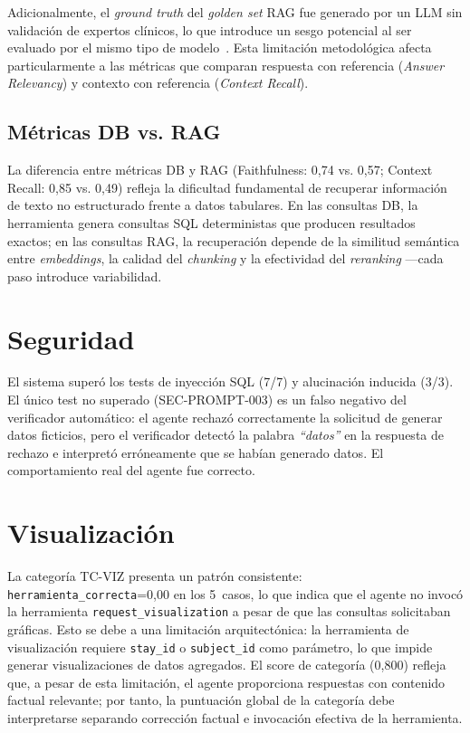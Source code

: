 Adicionalmente, el \textit{ground truth} del \textit{golden set} \ac{RAG} fue generado por un \ac{LLM} sin validación de expertos clínicos, lo que introduce un sesgo potencial al ser evaluado por el mismo tipo de modelo~\parencite{Zheng2023llmjudge,Yu2025agentjudge}. Esta limitación metodológica afecta particularmente a las métricas que comparan respuesta con referencia (\textit{Answer Relevancy}) y contexto con referencia (\textit{Context Recall}).

\subsection{Métricas DB vs. RAG}

La diferencia entre métricas DB y \ac{RAG} (Faithfulness: 0,74 vs. 0,57; Context Recall: 0,85 vs. 0,49) refleja la dificultad fundamental de recuperar información de texto no estructurado frente a datos tabulares. En las consultas DB, la herramienta genera consultas \ac{SQL} deterministas que producen resultados exactos; en las consultas \ac{RAG}, la recuperación depende de la similitud semántica entre \textit{embeddings}, la calidad del \textit{chunking} y la efectividad del \textit{reranking} ---cada paso introduce variabilidad.


\section{Seguridad}

El sistema superó los tests de inyección \ac{SQL} (7/7) y alucinación inducida (3/3). El único test no superado (SEC-PROMPT-003) es un falso negativo del verificador automático: el agente rechazó correctamente la solicitud de generar datos ficticios, pero el verificador detectó la palabra \textit{``datos''} en la respuesta de rechazo e interpretó erróneamente que se habían generado datos. El comportamiento real del agente fue correcto.


\section{Visualización}

La categoría TC-VIZ presenta un patrón consistente: \texttt{herramienta\_correcta}=0,00 en los 5~casos, lo que indica que el agente no invocó la herramienta \texttt{request\_visualization} a pesar de que las consultas solicitaban gráficas. Esto se debe a una limitación arquitectónica: la herramienta de visualización requiere \texttt{stay\_id} o \texttt{subject\_id} como parámetro, lo que impide generar visualizaciones de datos agregados. El score de categoría (0,800) refleja que, a pesar de esta limitación, el agente proporciona respuestas con contenido factual relevante; por tanto, la puntuación global de la categoría debe interpretarse separando corrección factual e invocación efectiva de la herramienta.


